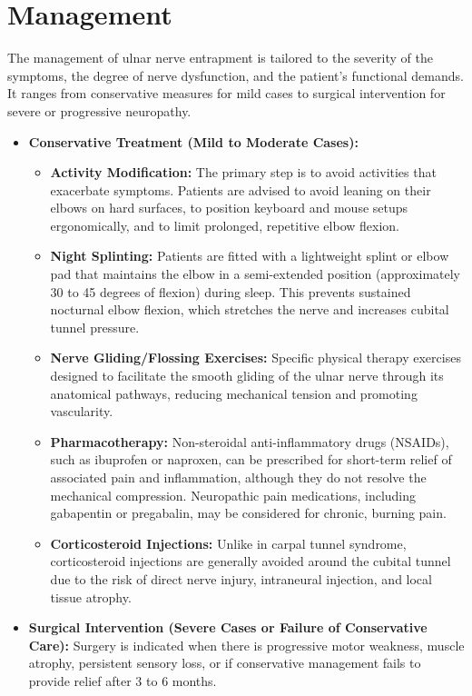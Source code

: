 \section*{Management}
The management of ulnar nerve entrapment is tailored to the severity of the symptoms, the degree of nerve dysfunction, and the patient's functional demands. It ranges from conservative measures for mild cases to surgical intervention for severe or progressive neuropathy.

\begin{itemize}
\item \textbf{Conservative Treatment (Mild to Moderate Cases):}
  \begin{itemize}
  \item \textbf{Activity Modification:} The primary step is to avoid activities that exacerbate symptoms. Patients are advised to avoid leaning on their elbows on hard surfaces, to position keyboard and mouse setups ergonomically, and to limit prolonged, repetitive elbow flexion.
  \item \textbf{Night Splinting:} Patients are fitted with a lightweight splint or elbow pad that maintains the elbow in a semi-extended position (approximately 30 to 45 degrees of flexion) during sleep. This prevents sustained nocturnal elbow flexion, which stretches the nerve and increases cubital tunnel pressure.
  \item \textbf{Nerve Gliding/Flossing Exercises:} Specific physical therapy exercises designed to facilitate the smooth gliding of the ulnar nerve through its anatomical pathways, reducing mechanical tension and promoting vascularity.
  \item \textbf{Pharmacotherapy:} Non-steroidal anti-inflammatory drugs (NSAIDs), such as ibuprofen or naproxen, can be prescribed for short-term relief of associated pain and inflammation, although they do not resolve the mechanical compression. Neuropathic pain medications, including gabapentin or pregabalin, may be considered for chronic, burning pain.
  \item \textbf{Corticosteroid Injections:} Unlike in carpal tunnel syndrome, corticosteroid injections are generally avoided around the cubital tunnel due to the risk of direct nerve injury, intraneural injection, and local tissue atrophy.
  \end{itemize}
\item \textbf{Surgical Intervention (Severe Cases or Failure of Conservative Care):} Surgery is indicated when there is progressive motor weakness, muscle atrophy, persistent sensory loss, or if conservative management fails to provide relief after 3 to 6 months.

\end{itemize}
